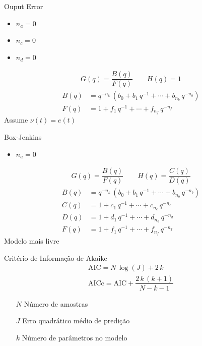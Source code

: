 \documentclass{beamer}
\newcommand{\Prod}{\,}
\renewcommand{\Prod}{\,}
\begin{document}
\begin{frame}{Ouput Error}
  \begin{itemize}
    \item $n_a=0$
    \item $n_c=0$
    \item $n_d=0$
  \end{itemize}
  \begin{gather}
    G(q) = \dfrac{B(q)}{F(q)}
    \qquad
    H(q) = 1
  \end{gather}
  \begin{align}
    B(q) &= q^{-n_k} \Prod \left(b_0 + b_1 \Prod q^{-1} + \dotsb + b_{n_b} \Prod q^{-n_b}\right)
    \\
    F(q) &= 1 + f_1 \Prod q^{-1} + \dotsb + f_{n_f} \Prod q^{-n_f}
  \end{align}
  Assume $\nu(t) = e(t)$
\end{frame}

\begin{frame}{Box-Jenkins}
  \begin{itemize}
    \item $n_a=0$
  \end{itemize}
  \begin{gather}
    G(q) = \dfrac{B(q)}{F(q)}
    \qquad
    H(q) = \dfrac{C(q)}{D(q)}
  \end{gather}
  \begin{align}
    B(q) &= q^{-n_k} \Prod \left(b_0 + b_1 \Prod q^{-1} + \dotsb + b_{n_b} \Prod q^{-n_b}\right)
    \\
    C(q) &= 1 + c_1 \Prod q^{-1} + \dotsb + c_{n_c} \Prod q^{-n_c}
    \\
    D(q) &= 1 + d_1 \Prod q^{-1} + \dotsb + d_{n_d} \Prod q^{-n_d}
    \\
    F(q) &= 1 + f_1 \Prod q^{-1} + \dotsb + f_{n_f} \Prod q^{-n_f}
  \end{align}
  Modelo mais livre
\end{frame}

\begin{frame}{Critério de Informação de Akaike}
  \begin{gather}
    \text{AIC} = N \Prod \log\left(J\right) + 2 \Prod k
    \\
    \text{AICc} = \text{AIC} + \dfrac{2 \Prod k \Prod \left(k + 1\right)}{N - k - 1}
  \end{gather}
  \begin{itemize}
    \item[$N$] Número de amostras
    \item[$J$] Erro quadrático médio de predição
    \item[$k$] Número de parâmetros no modelo
  \end{itemize}
\end{frame}
\end{document}

